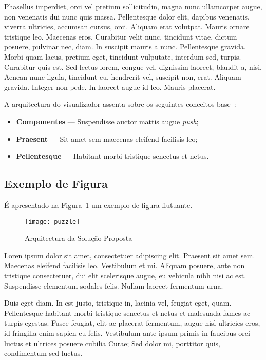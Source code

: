 Phasellus imperdiet, orci vel pretium sollicitudin, magna nunc
ullamcorper augue, non venenatis dui nunc quis massa. Pellentesque
dolor elit, dapibus venenatis, viverra ultricies, accumsan cursus,
orci. Aliquam erat volutpat. Mauris ornare tristique leo. Maecenas
eros. Curabitur velit nunc, tincidunt vitae, dictum posuere, pulvinar
nec, diam. In suscipit mauris a nunc. Pellentesque gravida. Morbi quam
lacus, pretium eget, tincidunt vulputate, interdum sed,
turpis. Curabitur quis est. Sed lectus lorem, congue vel, dignissim
laoreet, blandit a, nisi. Aenean nunc ligula, tincidunt eu, hendrerit
vel, suscipit non, erat. Aliquam gravida. Integer non pede. In laoreet
augue id leo. Mauris placerat. 

A arquitectura do visualizador assenta sobre os seguintes conceitos
base~\citep{kn:ZPMD97}: 

\begin{itemize}
\item \textbf{Componentes} --- Suspendisse auctor mattis augue \emph{push};
\item \textbf{Praesent} --- Sit amet sem maecenas eleifend facilisis leo;
\item \textbf{Pellentesque} --- Habitant morbi tristique senectus et netus.
\end{itemize}

\subsection{Exemplo de Figura}

É apresentado na Figura~\ref{fig:arch} %
um exemplo de figura flutuante.

\begin{figure}[t]
  \begin{center}
    \leavevmode
    \texttt{[image: puzzle]}
    \caption{Arquitectura da Solução Proposta}
    \label{fig:arch}
  \end{center}
\end{figure}

Loren ipsum dolor sit amet, consectetuer adipiscing elit. 
Praesent sit amet sem. Maecenas eleifend facilisis leo. Vestibulum et
mi. Aliquam posuere, ante non tristique consectetuer, dui elit
scelerisque augue, eu vehicula nibh nisi ac est. Suspendisse elementum
sodales felis. Nullam laoreet fermentum urna. 

Duis eget diam. In est justo, tristique in, lacinia vel, feugiat eget,
quam. Pellentesque habitant morbi tristique senectus et netus et
malesuada fames ac turpis egestas. Fusce feugiat, elit ac placerat
fermentum, augue nisl ultricies eros, id fringilla enim sapien eu
felis. Vestibulum ante ipsum primis in faucibus orci luctus et
ultrices posuere cubilia Curae; Sed dolor mi, porttitor quis,
condimentum sed luctus. 

